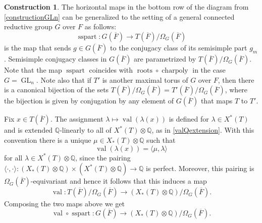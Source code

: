 \documentclass[11pt,a4paper]{article}
\theoremstyle{definition}
\newtheorem{const}[shared]{Construction}
\theoremstyle{plain}
\theoremstyle{remark}
\theoremstyle{plain}
\DeclareMathOperator{\GL}{GL}
\DeclareMathOperator{\val}{val}
\DeclareMathOperator{\charpoly}{charpoly}
\DeclareMathOperator{\roots}{roots}
\DeclareMathOperator{\semisimplepart}{sspart}
\begin{document}
\begin{const}\label{sspartG}
The horizontal maps in the bottom row of the diagram from \ref{constructionGLn} can be generalized to the setting of a general connected reductive group $G$ over $F$ as follows:
$$\semisimplepart: G(\overline{F}) \xrightarrow[]{} T(\overline{F})/\Omega_G(\overline{F}) $$
is the map that sends $g \in G(\overline{F})$ to the conjugacy class of its semisimple part $g_m$. Semisimple conjugacy classes in $G(\overline{F})$ are parametrized by $T(\overline{F})/\Omega_G(\overline{F})$. Note that the map $\semisimplepart$ coincides with $\roots \circ \charpoly$ in the case $G = \GL_n$. Note also that if $T'$ is another maximal torus of $G$ over $F$, then there is a canonical bijection of the sets $T(\overline{F}) / \Omega_G(\overline{F}) = T'(\overline{F})/ \Omega_G(\overline{F})$, where the bijection is given by conjugation by any element of $G(\overline{F})$ that maps $T$ to $T'$.

Fix $x \in T(\overline{F})$. The assignment $\lambda \mapsto \val(\lambda(x))$ is defined for $\lambda \in X^*(T)$ and is extended $\mathbb{Q}$-linearly to all of $X^*(T) \otimes \mathbb{Q}$, as in \ref{valQextension}. With this convention there is a unique $\mu \in X_*(T) \otimes \mathbb{Q}$ such that
$$ \val(\lambda(x)) =  \langle \mu, \lambda \rangle $$
for all $\lambda \in X^*(T) \otimes \mathbb{Q}$, since the pairing $\langle \cdot, \cdot \rangle: (X_*(T)\otimes{\mathbb{Q}}) \times (X^*(T) \otimes \mathbb{Q} )\xrightarrow[]{} \mathbb{Q}$ is perfect. Moreover, this pairing is $\Omega_G(\overline{F})$-equivariant and hence it follows that this induces a map $$ \val: T(\overline{F})/\Omega_G(\overline{F}) \xrightarrow[]{} (X_*(T) \otimes \mathbb{Q})/ \Omega_G(\overline{F}).$$
Composing the two maps above we get $$\val \circ \semisimplepart: G(\overline{F}) \xrightarrow[]{} (X_*(T) \otimes \mathbb{Q})/ \Omega_G(\overline{F}). $$
\end{const}
\end{document}

